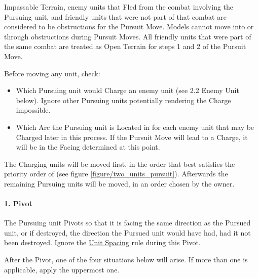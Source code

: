 Impassable Terrain, enemy units that Fled from the combat involving the Pursuing unit, and friendly units that were not part of that combat are considered to be obstructions for the Pursuit Move. Models cannot move into or through obstructions during Pursuit Moves. All friendly units that were part of the same combat are treated as Open Terrain for steps 1 and 2 of the Pursuit Move.

Before moving any unit, check:
\begin{itemize}
\item Which Pursuing unit would Charge an enemy unit (see 2.2 Enemy Unit below). Ignore other Pursuing units potentially rendering the Charge impossible.
\item Which Arc the Pursuing unit is Located in for each enemy unit that may be Charged later in this process. If the Pursuit Move will lead to a Charge, it will be in the Facing determined at this point.
\end{itemize}

The Charging units will be moved first, in the order that best satisfies the priority order of  (see figure \ref{figure/two_units_pursuit}). Afterwards the remaining Pursuing units will be moved, in an order chosen by the owner.

\paragraph{1. Pivot}

The Pursuing unit Pivots so that it is facing the same direction as the Pursued unit, or if destroyed, the direction the Pursued unit would have had, had it not been destroyed. Ignore the \hyperref[unit_spacing]{Unit Spacing} rule during this Pivot.

After the Pivot, one of the four situations below will arise. If more than one is applicable, apply the uppermost one.

